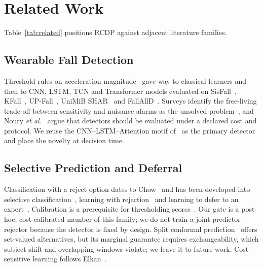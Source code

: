 \documentclass[journal]{IEEEtran}
\begin{document}
\section{Related Work}
\label{sec:related}

Table~\ref{tab:related} positions RCDP against adjacent literature families.



\subsection{Wearable Fall Detection}
Threshold rules on acceleration magnitude~\cite{bourke2007threshold,nurek2020fallsurvey} gave way to classical learners and then to CNN, LSTM, TCN and Transformer models evaluated on SisFall~\cite{sisfall2017}, KFall~\cite{kfall2021}, UP-Fall~\cite{martinez2019upfall}, UniMiB SHAR~\cite{micucci2017unimib} and FallAllD~\cite{saleh2021fallalld}. Surveys identify the free-living trade-off between sensitivity and nuisance alarms as the unsolved problem~\cite{iglesias2019wearable,khan2017review,ren2021survey,mubashir2013survey}, and Noury \textit{et al.}~\cite{noury2008evaluation} argue that detectors should be evaluated under a declared cost and protocol. We reuse the CNN--LSTM--Attention motif of~\cite{bhatti2025beyond} as the primary detector and place the novelty at decision time.

\subsection{Selective Prediction and Deferral}
Classification with a reject option dates to Chow~\cite{chow1970reject} and has been developed into selective classification~\cite{el2010foundations,geifman2017selective}, learning with rejection~\cite{cortes2016rejection} and learning to defer to an expert~\cite{madras2018defer,mozannar2020defer}. Calibration is a prerequisite for thresholding scores~\cite{guo2017calibration,platt1999probabilistic}. Our gate is a post-hoc, cost-calibrated member of this family; we do not train a joint predictor--rejector because the detector is fixed by design. Split conformal prediction~\cite{vovk2005algorithmic,shafer2008tutorial,angelopoulos2023gentle,romano2019conformalized} offers set-valued alternatives, but its marginal guarantee requires exchangeability, which subject shift and overlapping windows violate; we leave it to future work. Cost-sensitive learning follows Elkan~\cite{elkan2001foundations}.
\end{document}
